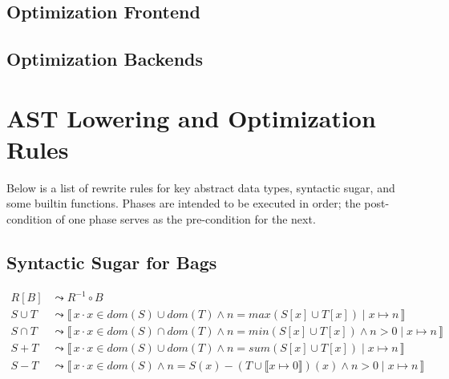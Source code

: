 \documentclass{article}
\newcommand{\bag}[3]{%
  \llbracket \, #1 \cdot #2 \mid #3 \, \rrbracket%
}
\begin{document}
\subsection{Optimization Frontend}
\subsection{Optimization Backends}

\section{AST Lowering and Optimization Rules}
Below is a list of rewrite rules for key abstract data types, syntactic sugar, and some builtin functions. Phases are intended to be executed in order; the post-condition of one phase serves as the pre-condition for the next.

\subsection{Syntactic Sugar for Bags}
\begin{align}
  \tag{Bag Image}
  R[B]
  &\leadsto
  R^{-1} \circ B
  \\
  \tag{Bag Predicates - Union}
  S \cup T &\leadsto \bag{x}{x \in dom(S) \cup dom(T) \land n = max(S[x] \cup T[x])}{x \mapsto n}
  \\
  \tag{Bag Predicates - Intersection}
  S \cap T &\leadsto \bag{x}{x \in dom(S) \cap dom(T) \land n = min(S[x] \cup T[x]) \land n > 0}{x \mapsto n}
  \\
  \tag{Bag Predicates - Sum}
  S + T &\leadsto \bag{x}{x \in dom(S) \cup dom(T) \land n = sum(S[x] \cup T[x])}{x \mapsto n}
  \\
  \tag{Bag Predicates - Difference}
  S - T &\leadsto \bag{x}{x \in dom(S) \land n = S(x) - (T \cup \llbracket x \mapsto 0\rrbracket)(x) \land n > 0}{x \mapsto n}
\end{align}
\end{document}
